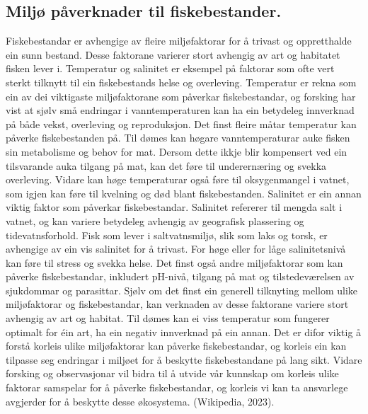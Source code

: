 \documentclass{report}
\begin{document}
\subsection{Miljø påverknader til fiskebestander.}
Fiskebestandar er avhengige av fleire miljøfaktorar for å trivast og oppretthalde ein sunn bestand. Desse faktorane varierer stort avhengig av art og habitatet fisken lever i. Temperatur og salinitet er eksempel på faktorar som ofte vert sterkt tilknytt til ein fiskebestands helse og overleving.
Temperatur er rekna som ein av dei viktigaste miljøfaktorane som påverkar fiskebestandar, og forsking har vist at sjølv små endringar i vanntemperaturen kan ha ein betydeleg innverknad på både vekst, overleving og reproduksjon. Det finst fleire måtar temperatur kan påverke fiskebestanden på. Til dømes kan høgare vanntemperaturar auke fisken sin metabolisme og behov for mat. Dersom dette ikkje blir kompensert ved ein tilsvarande auka tilgang på mat, kan det føre til underernæring og svekka overleving. Vidare kan høge temperaturar også føre til oksygenmangel i vatnet, som igjen kan føre til kvelning og død blant fiskebestanden.
Salinitet er ein annan viktig faktor som påverkar fiskebestandar. Salinitet refererer til mengda salt i vatnet, og kan variere betydeleg avhengig av geografisk plassering og tidevatnsforhold. Fisk som lever i saltvatnsmiljø, slik som laks og torsk, er avhengige av ein vis salinitet for å trivast. For høge eller for låge salinitetsnivå kan føre til stress og svekka helse.
Det finst også andre miljøfaktorar som kan påverke fiskebestandar, inkludert pH-nivå, tilgang på mat og tilstedeværelsen av sjukdommar og parasittar. Sjølv om det finst ein generell tilknyting mellom ulike miljøfaktorar og fiskebestandar, kan verknaden av desse faktorane variere stort avhengig av art og habitat. Til dømes kan ei viss temperatur som fungerer optimalt for éin art, ha ein negativ innverknad på ein annan.
Det er difor viktig å forstå korleis ulike miljøfaktorar kan påverke fiskebestandar, og korleis ein kan tilpasse seg endringar i miljøet for å beskytte fiskebestandane på lang sikt. Vidare forsking og observasjonar vil bidra til å utvide vår kunnskap om korleis ulike faktorar samspelar for å påverke fiskebestandar, og korleis vi kan ta ansvarlege avgjerder for å beskytte desse økosystema.
(Wikipedia, 2023).
\end{document}

